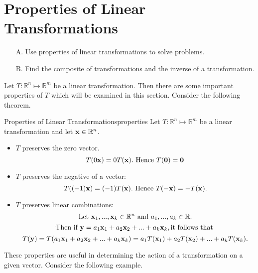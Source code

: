\section{Properties of Linear Transformations}

\begin{outcome}
\begin{enumerate}
\item[A.] Use properties of linear transformations to solve problems. 

\item[B.] Find the composite of transformations and the inverse of a transformation.
\end{enumerate}
\end{outcome}

Let $T: \mathbb{R}^n \mapsto \mathbb{R}^m$ be a linear transformation. Then there are some important properties of $T$ which will be examined in this section. 
Consider the following theorem.

\begin{theorem}{Properties of Linear Transformations}{properties}
Let $T: \mathbb{R}^n \mapsto \mathbb{R}^m$ be a linear transformation and let ${\bf x} \in \mathbb{R}^n$. 

\begin{itemize}
\item $T$ preserves the zero vector. 
\[
T(0{\bf x}) = 0 T({\bf x}). \mbox{ Hence }T({\bf 0}) = {\bf 0}
\]
\item $T$ preserves the negative of a vector:
\[
T( (-1){\bf x})=(-1)T({\bf x}). \mbox{ Hence }T(-{\bf x}) = -T({\bf x}).
\]
\item $T$ preserves linear combinations:
\[
\mbox{Let }{\bf x}_1, ..., {\bf x}_k \in \mathbb{R}^n \mbox{ and }a_1, ..., a_k \in \mathbb{R}.
\]
\[
\mbox{Then if }{\bf y} = a_1{\bf x}_1 + a_2{\bf x}_2 + ...+a_k {\bf x}_k, \mbox{it follows that }
\]
\[
T({\bf y}) = T(a_1{\bf x}_1 + a_2{\bf x}_2 + ...+a_k {\bf x}_k) = a_1T({\bf x}_1) + a_2T({\bf x}_2) + ...+a_k T({\bf x}_k).
\] 
\end{itemize}
\end{theorem}

These properties are useful in determining the action of a transformation on a given vector. Consider the following example.

